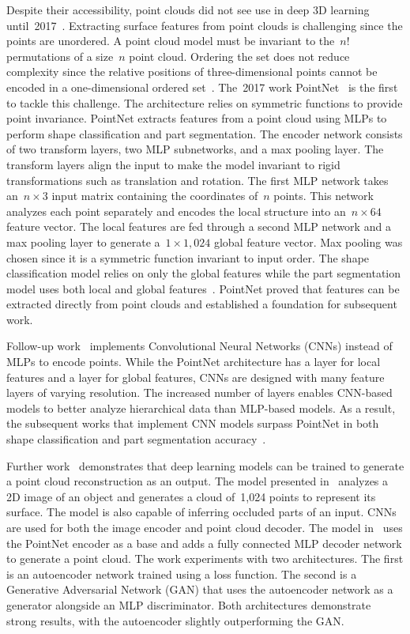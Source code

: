 Despite their accessibility, point clouds did not see use in deep 3D learning until~2017~\cite{Xiao2020}. Extracting surface features from point clouds is challenging since the points are unordered. A point cloud model must be invariant to the~$n!$ permutations of a size~$n$ point cloud. Ordering the set does not reduce complexity since the relative positions of three-dimensional points cannot be encoded in a one-dimensional ordered set~\cite{Qi2017}. The~2017 work PointNet~\cite{Qi2017} is the first to tackle this challenge. The architecture relies on symmetric functions to provide point invariance. PointNet extracts features from a point cloud using MLPs to perform shape classification and part segmentation. The encoder network consists of two transform layers, two MLP subnetworks, and a max pooling layer. The transform layers align the input to make the model invariant to rigid transformations such as translation and rotation. The first MLP network takes an~$n \times 3$ input matrix containing the coordinates of~$n$ points. This network analyzes each point separately and encodes the local structure into an~$n \times 64$ feature vector. The local features are fed through a second MLP network and a max pooling layer to generate a~$1 \times 1{,}024$ global feature vector. Max pooling was chosen since it is a symmetric function invariant to input order. The shape classification model relies on only the global features while the part segmentation model uses both local and global features~\cite{Qi2017}. PointNet proved that features can be extracted directly from point clouds and established a foundation for subsequent work.

Follow-up work~\cite{Xu2018, Li2018, Wu2019} implements Convolutional Neural Networks (CNNs) instead of MLPs to encode points. While the PointNet architecture has a layer for local features and a layer for global features, CNNs are designed with many feature layers of varying resolution. The increased number of layers enables CNN-based models to better analyze hierarchical data than MLP-based models. As a result, the subsequent works that implement CNN models surpass PointNet in both shape classification and part segmentation accuracy~\cite{Wu2019}.

Further work~\cite{Fan2017, Achlioptas2018} demonstrates that deep learning models can be trained to generate a point cloud reconstruction as an output. The model presented in~\cite{Fan2017} analyzes a 2D image of an object and generates a cloud of~1,024 points to represent its surface. The model is also capable of inferring occluded parts of an input. CNNs are used for both the image encoder and point cloud decoder. The model in~\cite{Achlioptas2018} uses the PointNet encoder as a base and adds a fully connected MLP decoder network to generate a point cloud. The work experiments with two architectures. The first is an autoencoder network trained using a loss function. The second is a Generative Adversarial Network (GAN) that uses the autoencoder network as a generator alongside an MLP discriminator. Both architectures demonstrate strong results, with the autoencoder slightly outperforming the GAN.


